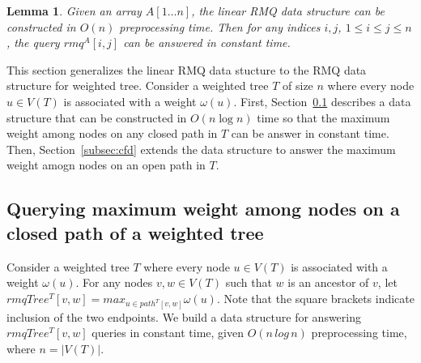 \documentclass[final,1p,times]{elsarticle}
\newcommand{\weight}{\omega}
\newtheorem{lemma}[theorem]{Lemma}
\begin{document}
    \begin{lemma}
        \label{lem:linearrmq}
	    Given an array $A[1 \ldots n]$, the \textit{linear RMQ data structure} can be constructed in $O(n)$ preprocessing time. Then for any indices $i, j$, $1 \leq i \leq j \leq n$, the query $rmq^A[i, j]$ can be answered in constant time.
    \end{lemma}

This section generalizes the linear RMQ data stucture to the RMQ data structure for weighted tree. 
Consider a weighted tree $T$ of size $n$ where every node $u \in V(T)$ is associated with a weight $\weight(u)$. 
First, Section~\ref{subsec:rmqtreeinc} describes a data structure that can be constructed in $O(n \log n)$ time so that the maximum weight among nodes on any closed path in $T$ can be answer in constant time.
Then, Section~\ref{subsec:cfd} extends the data structure to answer the maximum weight amogn nodes on an open path in $T$.


    \subsection{Querying maximum weight among nodes on a closed path of a weighted tree}
    \label{subsec:rmqtreeinc}

    Consider a weighted tree $T$ where every node $u \in V(T)$ is associated with a weight $\weight(u)$. For any nodes $v, w \in V(T)$ such that $w$ is an ancestor of $v$, let $rmqTree^T[v, w] = max_{u \in path^T[v, w]}\weight(u)$. Note that the square brackets indicate inclusion of the two endpoints. We build a data structure for answering $rmqTree^T[v, w]$ queries in constant time, given $O(n\,log\,n)$ preprocessing time, where $n = |V(T)|$.
\end{document}
